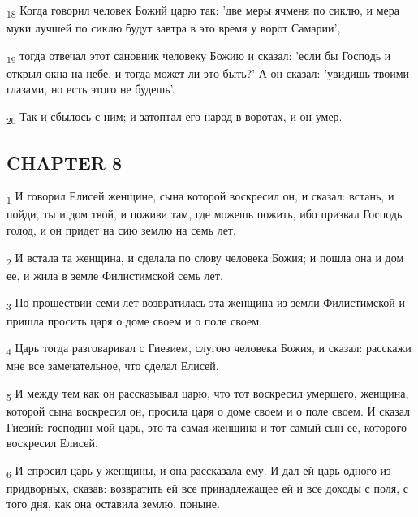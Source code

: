\begin{tcolorbox}
\textsubscript{18} Когда говорил человек Божий царю так: 'две меры ячменя по сиклю, и мера муки лучшей по сиклю будут завтра в это время у ворот Самарии',
\end{tcolorbox}
\begin{tcolorbox}
\textsubscript{19} тогда отвечал этот сановник человеку Божию и сказал: 'если бы Господь и открыл окна на небе, и тогда может ли это быть?' А он сказал: 'увидишь твоими глазами, но есть этого не будешь'.
\end{tcolorbox}
\begin{tcolorbox}
\textsubscript{20} Так и сбылось с ним; и затоптал его народ в воротах, и он умер.
\end{tcolorbox}
\subsection{CHAPTER 8}
\begin{tcolorbox}
\textsubscript{1} И говорил Елисей женщине, сына которой воскресил он, и сказал: встань, и пойди, ты и дом твой, и поживи там, где можешь пожить, ибо призвал Господь голод, и он придет на сию землю на семь лет.
\end{tcolorbox}
\begin{tcolorbox}
\textsubscript{2} И встала та женщина, и сделала по слову человека Божия; и пошла она и дом ее, и жила в земле Филистимской семь лет.
\end{tcolorbox}
\begin{tcolorbox}
\textsubscript{3} По прошествии семи лет возвратилась эта женщина из земли Филистимской и пришла просить царя о доме своем и о поле своем.
\end{tcolorbox}
\begin{tcolorbox}
\textsubscript{4} Царь тогда разговаривал с Гиезием, слугою человека Божия, и сказал: расскажи мне все замечательное, что сделал Елисей.
\end{tcolorbox}
\begin{tcolorbox}
\textsubscript{5} И между тем как он рассказывал царю, что тот воскресил умершего, женщина, которой сына воскресил он, просила царя о доме своем и о поле своем. И сказал Гиезий: господин мой царь, это та самая женщина и тот самый сын ее, которого воскресил Елисей.
\end{tcolorbox}
\begin{tcolorbox}
\textsubscript{6} И спросил царь у женщины, и она рассказала ему. И дал ей царь одного из придворных, сказав: возвратить ей все принадлежащее ей и все доходы с поля, с того дня, как она оставила землю, поныне.
\end{tcolorbox}
